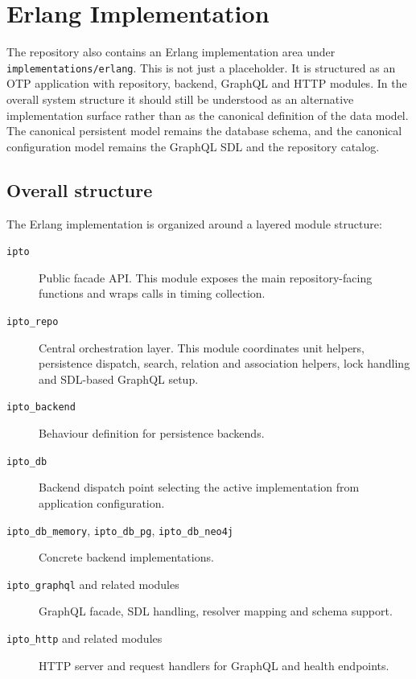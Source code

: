\section{Erlang Implementation}
\label{sec:ErlangImplementation}

The repository also contains an Erlang implementation area under \texttt{implementations/erlang}. This is not just a placeholder. It is structured as an OTP application with repository, backend, GraphQL and HTTP modules. In the overall system structure it should still be understood as an alternative implementation surface rather than as the canonical definition of the data model. The canonical persistent model remains the database schema, and the canonical configuration model remains the GraphQL SDL and the repository catalog.

\subsection{Overall structure}

The Erlang implementation is organized around a layered module structure:
\begin{description}
\item[\texttt{ipto}] Public facade API. This module exposes the main repository-facing functions and wraps calls in timing collection.
\vspace{.2cm}
\item[\texttt{ipto\_repo}] Central orchestration layer. This module coordinates unit helpers, persistence dispatch, search, relation and association helpers, lock handling and SDL-based GraphQL setup.
\vspace{.2cm}
\item[\texttt{ipto\_backend}] Behaviour definition for persistence backends.
\vspace{.2cm}
\item[\texttt{ipto\_db}] Backend dispatch point selecting the active implementation from application configuration.
\vspace{.2cm}
\item[\texttt{ipto\_db\_memory}, \texttt{ipto\_db\_pg}, \texttt{ipto\_db\_neo4j}] Concrete backend implementations.
\vspace{.2cm}
\item[\texttt{ipto\_graphql} and related modules] GraphQL facade, SDL handling, resolver mapping and schema support.
\vspace{.2cm}
\item[\texttt{ipto\_http} and related modules] HTTP server and request handlers for GraphQL and health endpoints.
\end{description}

